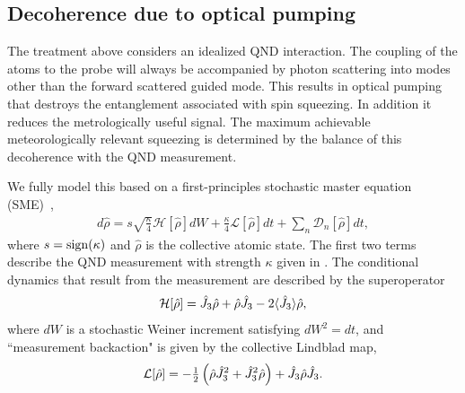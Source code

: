 \documentclass[preprint,aps,pra,onecolumn]{revtex4-1} %
\newcommand{\jz}{\hat{J}_3}
\begin{document}
	\subsection{Decoherence due to optical pumping}

The treatment above considers an idealized QND interaction. The coupling of the atoms to the probe will always be accompanied by photon scattering into modes other than the forward scattered guided mode.  
This results in optical pumping that destroys the entanglement associated with spin squeezing.  
In addition it reduces the metrologically useful signal.  The maximum achievable meteorologically relevant squeezing is determined by the balance of this decoherence with the QND measurement. 

We fully model this based on a first-principles stochastic master equation (SME)~\cite{?},
	\begin{align} \label{Eq::SME}
		d \hat{\rho} = s\sqrt{\frac{\kappa}{4}} \mathcal{H}[\hat{\rho}] dW + \frac{\kappa}{4} \mathcal{L}[\hat{\rho}] dt + \sum_n \mathcal{D}_n [\hat{\rho}] dt,
	\end{align}
where $s = {\rm sign}(\kappa)$ and $\hat{\rho}$ is the collective atomic state. 
The first two terms describe the QND measurement with strength $\kappa$ given in . The conditional dynamics that result from the measurement are described by the superoperator
	\begin{align}
		\mathcal{H}[\hat{\rho}] = \jz \hat{\rho} + \hat{\rho} \jz - 2 \expt{\jz} \hat{\rho},
	\end{align}
where $dW$ is a stochastic Weiner increment satisfying $dW^2 = dt$, and ``measurement backaction" is given by the collective Lindblad map, 
	\begin{align}
		\mathcal{L}[\hat{\rho}] = - \smallfrac{1}{2}  \left(\hat{\rho}  \jz^2 + \jz^2 \hat{\rho}\right) + \jz \hat{\rho} \jz.
	\end{align}
\end{document}
